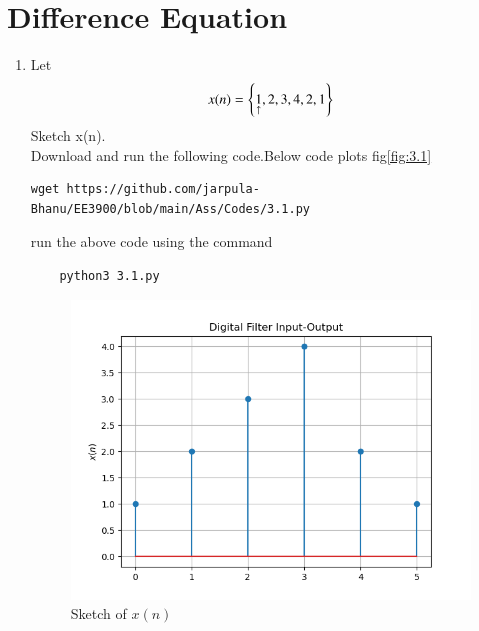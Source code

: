 \documentclass[journal,12pt,twocolumn]{IEEEtran}
\renewcommand\thesection{\arabic{section}}
\begin{document}
\section{Difference Equation}

\begin{enumerate}[label=\thesection.\arabic*
,ref=\thesection.\theenumi]
\item Let 
\begin{align}
	x(n) = \left\{\underset{\uparrow}{1},2,3,4,2,1\right\}
\end{align}
Sketch x(n).\\
\solution Download and run the following code.Below code plots fig\eqref{fig:3.1}
\begin{lstlisting}
wget https://github.com/jarpula-Bhanu/EE3900/blob/main/Ass/Codes/3.1.py
\end{lstlisting}
run the above code using the command
\begin{lstlisting}
	python3 3.1.py
\end{lstlisting}
\begin{figure}[h]
    \centering
    \includegraphics[width=\columnwidth]{./figs/3.1.png}
    \caption{Sketch of $x(n)$}
    \label{fig:3.1}
\end{figure}


\end{enumerate}
\end{document}
